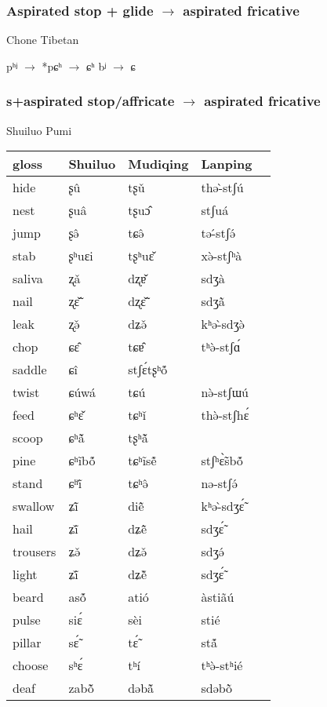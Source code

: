 \documentclass[oldfontcommands,oneside,a4paper,11pt]{article}
\newcommand{\ipa}[1]{{\phon \mbox{#1}}} %
\begin{document}
\subsubsection{Aspirated stop + glide $\rightarrow$ aspirated fricative}
Chone Tibetan
\begin{exe}
\ex 
\glt *pʰʲ $\rightarrow$ *pɕʰ $\rightarrow$ ɕʰ
\glt *bʲ $\rightarrow$ ɕ  
\end{exe}

\subsubsection{s+aspirated stop/affricate $\rightarrow$ aspirated fricative}
Shuiluo Pumi

\begin{table}[H]
\centering
\begin{tabular}{lllll}
\toprule
gloss & 	Shuiluo & 	Mudiqing & 	Lanping \\ 	
\midrule
hide & 	\ipa{ʂû} & 	\ipa{tʂǔ} & 	\ipa{thə-̀stʃú} \\ 	
nest & 	\ipa{ʂuâ} & 	\ipa{tʂuɔ̂} & 	\ipa{stʃuá} \\ 	
jump & 	\ipa{ʂə̂} & 	\ipa{tɕə̂} & 	\ipa{tə-́stʃə́} \\ 	
stab & 	\ipa{ʂʰuɛi} & 	\ipa{tʂʰuɛ̌} & 	\ipa{xə̀-stʃʰà} \\ 	
saliva & 	\ipa{ʐǎ} & 	\ipa{dʐɐ̌} & 	\ipa{sdʒà} \\ 	
nail & 	\ipa{ʐɛ̃̌} & 	\ipa{dʐɛ̃̌} & 	\ipa{sdʒã̀} \\ 	
leak & 	\ipa{ʐə̌} & 	\ipa{dʑə̌} & 	\ipa{kʰə-̀sdʒə̀} \\ 	
chop & 	\ipa{ɕɛ̂} & 	\ipa{tɕɐ̂} & 	\ipa{tʰə̀-stʃɑ́} \\ 	
saddle & 	\ipa{ɕî} & 	\ipa{stʃɛ́tʂʰṍ} & 	\ipa{} \\ 	
twist & 	\ipa{ɕúwá} & 	\ipa{tɕú} & 	\ipa{nə̀-stʃɯú} \\ 	
feed & 	\ipa{ɕʰɛ̌} & 	\ipa{tɕʰǐ} & 	\ipa{thə̀-stʃhɛ́} \\ 	
scoop & 	\ipa{ɕʰã̌} & 	\ipa{tʂʰã̌} & 	\ipa{} \\ 	
pine & 	\ipa{ɕʰĩbṍ} & 	\ipa{tɕʰĩsẽ́} & 	\ipa{stʃʰɛ̃̀sbṍ} \\ 	
stand & 	\ipa{ɕʰĩ̌} & 	\ipa{tɕʰə̂} & 	\ipa{nə-stʃə́} \\ 	
swallow & 	\ipa{ʑĩ̂} & 	\ipa{diẽ̂} & 	\ipa{kʰə-̀sdʒɛ̃́} \\ 	
hail & 	\ipa{ʑĩ̌} & 	\ipa{dʑẽ̂} & 	\ipa{sdʒɛ̃́} \\ 	
trousers & 	\ipa{ʑə̌} & 	\ipa{dʑə̌} & 	\ipa{sdʒə́} \\ 	
light & 	\ipa{ʑĩ̌} & 	\ipa{dʑẽ̌} & 	\ipa{sdʒɛ̃́} \\ 	
beard & 	\ipa{asṍ} & 	\ipa{atió} & 	\ipa{àstiãú} \\ 	
pulse & 	\ipa{siɛ́} & 	\ipa{sèi} & 	\ipa{stié} \\ 	
pillar & 	\ipa{sɛ̃́} & 	\ipa{tɛ̃́} & 	\ipa{stã́} \\ 	
choose & 	\ipa{sʰɛ́} & 	\ipa{tʰí} & 	\ipa{tʰə̀-stʰié} \\ 	
deaf & 	\ipa{zabõ̌} & 	\ipa{dəbã̌} & 	\ipa{sdəbõ̀} \\ 	
\bottomrule
\end{tabular}
\end{table}
\end{document}
